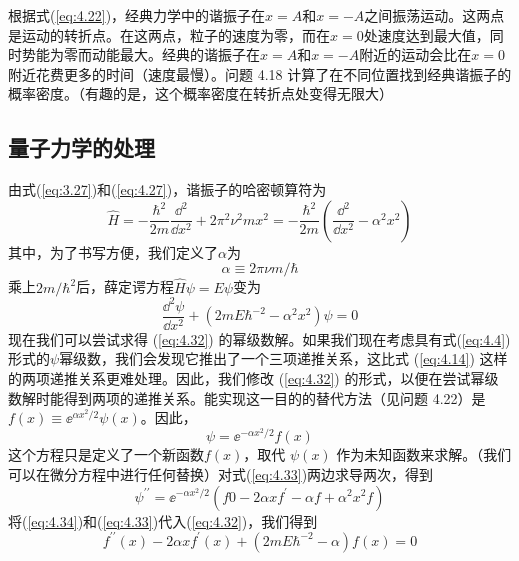     根据式(\ref{eq:4.22})，经典力学中的谐振子在$x=A$和$x=-A$之间振荡运动。这两点是运动的转折点。在这两点，粒子的速度为零，而在$x=0$处速度达到最大值，同时势能为零而动能最大。经典的谐振子在$x=A$和$x=-A$附近的运动会比在$x=0$附近花费更多的时间（速度最慢）。问题 4.18 计算了在不同位置找到经典谐振子的概率密度。（有趣的是，这个概率密度在转折点处变得无限大）
    
\subsection*{量子力学的处理}
    由式(\ref{eq:3.27})和(\ref{eq:4.27})，谐振子的哈密顿算符为
    \begin{equation}
        \hat{H} = -\frac{\hbar^2}{2m}\frac{\dd ^2}{\dd x^2} + 2\pi^2 \nu^2 m x^2 = -\frac{\hbar^2}{2m}\left(\frac{\dd ^2}{\dd x^2} - \alpha^2x^2\right)
        \label{eq:4.30}
    \end{equation}
    其中，为了书写方便，我们定义了$\alpha$为
    \begin{equation}
        \alpha \equiv 2\pi\nu m/\hbar
        \label{eq:4.31}
    \end{equation}
    乘上$2m/\hbar^2$后，薛定谔方程$\hat{H}\psi = E\psi$变为
    \begin{equation}
        \frac{\dd ^2\psi}{\dd x^2} + \left(2mE\hbar^{-2}-\alpha^2x^2\right)\psi = 0
        \label{eq:4.32}
    \end{equation}
    现在我们可以尝试求得 (\ref{eq:4.32}) 的幂级数解。如果我们现在考虑具有式(\ref{eq:4.4})形式的$\psi$幂级数，我们会发现它推出了一个三项递推关系，这比式 (\ref{eq:4.14}) 这样的两项递推关系更难处理。因此，我们修改 (\ref{eq:4.32}) 的形式，以便在尝试幂级数解时能得到两项的递推关系。能实现这一目的的替代方法（见问题 4.22）是$f\left(x\right) \equiv \ee ^{\alpha x^2/2}\psi\left(x\right)$。因此，
    \begin{equation}
        \psi = \ee ^{-\alpha x^2/2}f\left(x\right)
        \label{eq:4.33}
    \end{equation}
    这个方程只是定义了一个新函数$f\left(x\right)$，取代 $\psi\left(x\right)$ 作为未知函数来求解。（我们可以在微分方程中进行任何替换）对式(\ref{eq:4.33})两边求导两次，得到
    \begin{equation}
        \psi^{\prime\prime} = \ee ^{-\alpha x^2/2}\left(f0-2\alpha xf^{\prime} - \alpha f + \alpha^2x^2f\right)
        \label{eq:4.34}
    \end{equation}
    将(\ref{eq:4.34})和(\ref{eq:4.33})代入(\ref{eq:4.32})，我们得到
    \begin{equation}
        f^{\prime\prime}\left(x\right) - 2\alpha x f^{\prime}\left(x\right) + \left(2mE\hbar^{-2} - \alpha\right)f\left(x\right) = 0
        \label{eq:4.35}
    \end{equation}
